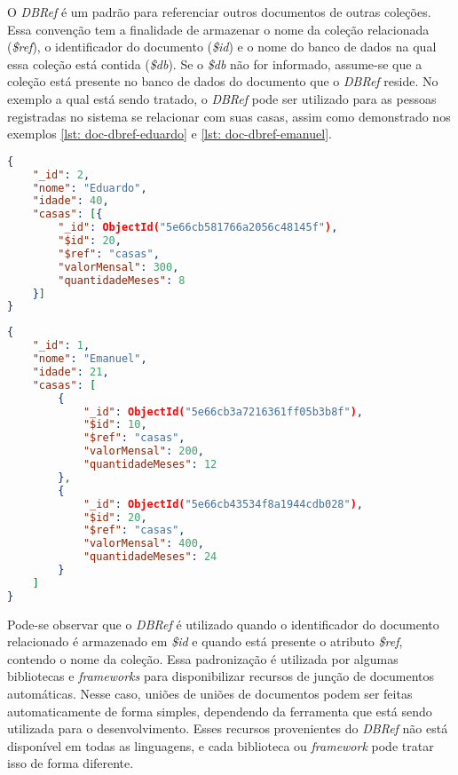 O \textit{DBRef} é um padrão para referenciar outros documentos de outras coleções. Essa convenção tem a finalidade de armazenar o nome da coleção relacionada (\textit{\$ref}), o identificador do documento (\textit{\$id}) e o nome do banco de dados na qual essa coleção está contida (\textit{\$db}). Se o \textit{\$db} não for informado, assume-se que a coleção está presente no banco de dados do documento que o \textit{DBRef} reside. No exemplo a qual está sendo tratado, o \textit{DBRef} pode ser utilizado para as pessoas registradas no sistema se relacionar com suas casas, assim como demonstrado nos exemplos \ref{lst: doc-dbref-eduardo} e \ref{lst: doc-dbref-emanuel}.

\newpage

\begin{lstlisting}[language=json, caption={Documento da Pessoa \textit{Eduardo} com \textit{DBRef}\label{lst: doc-dbref-eduardo}}]
{
    "_id": 2,
    "nome": "Eduardo",
    "idade": 40,
    "casas": [{
        "_id": ObjectId("5e66cb581766a2056c48145f"),
        "$id": 20,
        "$ref": "casas",
        "valorMensal": 300,
        "quantidadeMeses": 8
    }]
}
\end{lstlisting}


\begin{lstlisting}[language=json, caption={Documento da Pessoa \textit{Emanuel} com \textit{DBRef}\label{lst: doc-dbref-emanuel}}]
{
    "_id": 1,
    "nome": "Emanuel",
    "idade": 21,
    "casas": [
        {
            "_id": ObjectId("5e66cb3a7216361ff05b3b8f"),
            "$id": 10,
            "$ref": "casas",
            "valorMensal": 200,
            "quantidadeMeses": 12
        },
        {
            "_id": ObjectId("5e66cb43534f8a1944cdb028"),
            "$id": 20,
            "$ref": "casas",
            "valorMensal": 400,
            "quantidadeMeses": 24
        }
    ]
}
\end{lstlisting}

Pode-se observar que o \textit{DBRef} é utilizado quando o identificador do documento relacionado é armazenado em \textit{\$id} e quando está presente o atributo \textit{\$ref}, contendo o nome da coleção. Essa padronização é utilizada por algumas bibliotecas e \textit{frameworks} para disponibilizar recursos de junção de documentos automáticas. Nesse caso, uniões de uniões de documentos podem ser feitas automaticamente de forma simples, dependendo da ferramenta que está sendo utilizada para o desenvolvimento. Esses recursos provenientes do \textit{DBRef} não está disponível em todas as linguagens, e cada biblioteca ou \textit{framework} pode tratar isso de forma diferente.


